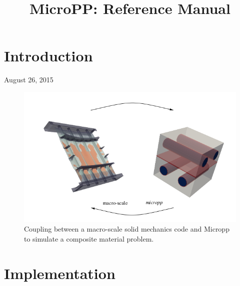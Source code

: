 \documentclass[conference, onecolumn]{IEEEtran}
\begin{document}
\title{MicroPP: Reference Manual}

\author{
}

\maketitle


\IEEEpeerreviewmaketitle

\section{Introduction}

\hfill August 26, 2015

\begin{figure}
	\centering
	\includegraphics[width=0.95\linewidth]{figures/coupling-micropp-macro.png}
	\caption{\label{fig:disp}
		Coupling between a macro-scale solid mechanics code and Micropp to simulate a composite material
		problem.
	}
\end{figure}



\section{Implementation}

\begin{figure}[!htbp]
	\centering
	\resizebox{5cm}{!}{}
	\vspace{0.5cm}
	\caption{\label{fig:comp_scheme}}
\end{figure}
\end{document}

